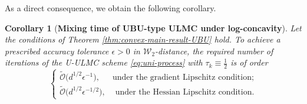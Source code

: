 \documentclass[12pt]{article}
\newenvironment{redtext}
  {\color{black}\ignorespaces}
  {\ignorespacesafterend}
\numberwithin{equation}{section}
\newtheorem{prop}{Proposition}[section]
\newtheorem{cor}{Corollary}[section]
\begin{document}
\begin{redtext}
As a direct consequence, we obtain the following corollary.


\begin{cor}[\textbf{Mixing time of UBU-type ULMC under log-concavity}]
\label{cor:mixing-time-convex-UBU}
Let the conditions of Theorem
\ref{thm:convex-main-result-UBU} hold.
To achieve a prescribed accuracy tolerance
\(\epsilon>0\) in \(\mathcal W_2\)-distance, the required
number of iterations of the U-ULMC scheme
\eqref{eq:uni-process} with \(\tau_k\equiv\frac12\) is of order
\[
\begin{cases}
\widetilde{\mathcal O}
\bigl(d^{1/2}\epsilon^{-1}\bigr),
& \text{under the gradient Lipschitz condition};\\[1mm]
\widetilde{\mathcal O}
\bigl(d^{1/2}\epsilon^{-1/2}\bigr),
&\text{ under the Hessian Lipschitz condition.}
\end{cases}
\]
\end{cor}

\end{redtext}
\end{document}
